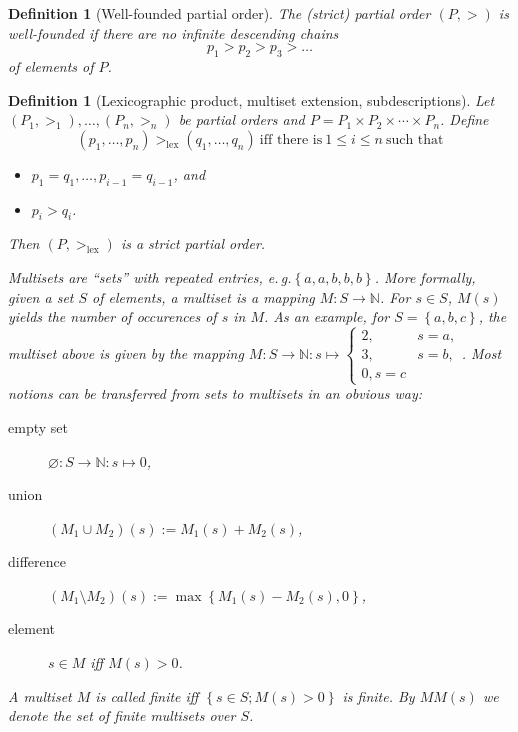 \documentclass[openany]{scrbook}
\theoremstyle{break}
\newtheorem{Definition}[Theorem]{Definition}
\theoremstyle{nonumberbreak}
\theoremstyle{nonumberplain}
\theoremstyle{nonumberbreak}
\newcommand{\N}{\mathbb{N}}
\newcommand{\set}[1]{\left\{#1\right\}}
\newcommand{\eg}{e{.}\,g{.}\xspace}
\newcommand{\gtlex}{>_{\operatorname{lex}}}
\begin{document}
\begin{Definition}[Well-founded partial order]
  \label{4.3}
  The (strict) partial order $(P, >)$ is well-founded if there are no
  infinite descending chains
  \begin{equation*}
    p_1 > p_2 > p_3 > \dotso
  \end{equation*}
  of elements of $P$.
\end{Definition}

\begin{Definition}[Lexicographic product, multiset extension, subdescriptions]
  \label{4.4}
  Let $(P_1, >_1), \dotsc, (P_n, >_n)$ be partial orders and $P = P_1
  \times P_2 \times \dotsb \times P_n$. Define
  \begin{equation*}
    (p_1, \dotsc, p_n) \gtlex (q_1, \dotsc, q_n)\ \text{iff there is}\
    1 \leq i \leq n\ \text{such that}
  \end{equation*}
  \begin{itemize}
  \item $p_1 = q_1, \dotsc, p_{i - 1} = q_{i - 1}$, and
  \item $p_i > q_i$.
  \end{itemize}

  Then $(P, \gtlex)$ is a strict partial order.

  Multisets are ``sets'' with repeated entries, \eg $\set{a, a, b, b,
    b}$. More formally, given a set $S$ of elements, a multiset is a
  mapping $M: S \to \N$. For $s \in S$, $M(s)$ yields the number of
  occurences of $s$ in $M$. As an example, for $S = \set{a, b, c}$,
  the multiset above is given by the mapping $M: S \to \N: s
  \mapsto \begin{cases} 2, & s = a, \\ 3, & s = b, \\ 0, s =
    c \end{cases}$. Most notions can be transferred from sets to
  multisets in an obvious way:
  \begin{description}
  \item[empty set] $\varnothing: S \to \N: s \mapsto 0$,
  \item[union] $(M_1 \cup M_2)(s) := M_1(s) + M_2(s)$,
  \item[difference] $(M_1 \setminus M_2)(s) := \max\set{M_1(s) -
      M_2(s), 0}$,
  \item[element] $s \in M$ iff $M(s) > 0$.
  \end{description}

  A multiset $M$ is called finite iff $\set{s \in S; M(s) > 0}$ is
  finite. By $MM(s)$ we denote the set of finite multisets over $S$.


\end{Definition}
\end{document}
